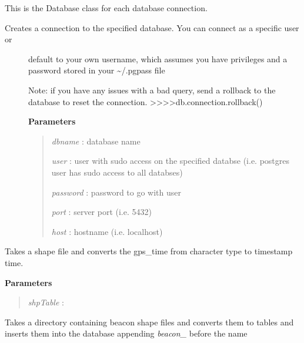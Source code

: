 \documentclass[letterpaper,10pt,english]{sphinxmanual}
\begin{document}
\begin{fulllineitems}
\label{code:Database.Database}
This is the Database class for each database connection.
\begin{description}
\item[{Creates a connection to the specified database.  You can connect as a specific user or }] \leavevmode
default to your own username, which assumes you have privileges and a password stored in your  \textasciitilde{}/.pgpass file

Note: if you have any issues with a bad query, send a rollback to the database to reset the connection.
\textgreater{}\textgreater{}\textgreater{}\textgreater{}db.connection.rollback()

\textbf{Parameters}
\begin{quote}

\emph{dbname}   : database name

\emph{user}     : user with sudo access on the specified databse (i.e. postgres user has sudo access to all databses)

\emph{password} : password to go with user

\emph{port}     : server port (i.e. 5432)

\emph{host}     : hostname (i.e. localhost)
\end{quote}

\end{description}

\begin{fulllineitems}
\label{code:Database.Database.alterTimestamp}
Takes a shape file and converts the gps\_time from character type to timestamp time.

\textbf{Parameters}
\begin{quote}

\emph{shpTable} :
\end{quote}

\end{fulllineitems}


\begin{fulllineitems}
\label{code:Database.Database.beaconShapefilesToTables}
Takes a directory containing beacon shape files and converts them to tables and 
inserts them into the database appending \emph{beacon\_} before the name


\end{fulllineitems}
\end{fulllineitems}
\end{document}
